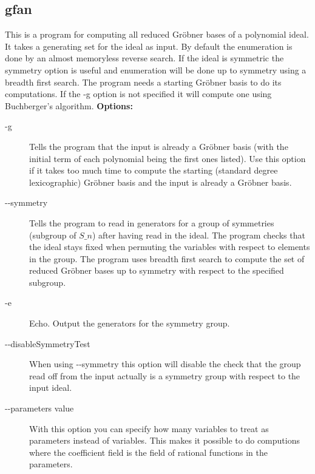 {\subsection{gfan}\label{applist:}
This is a program for computing all reduced Gr\"obner bases of a polynomial ideal. It takes a generating set for the ideal as input. By default the enumeration is done by an almost memoryless reverse search. If the ideal is symmetric the symmetry option is useful and enumeration will be done up to symmetry using a breadth first search. The program needs a starting Gr\"obner basis to do its computations. If the -g option is not specified it will compute one using Buchberger's algorithm.
\newline
{\bf Options:}
\begin{description}
\item[-g]Tells the program that the input is already a Gr\"obner basis (with the initial term of each polynomial being the first ones listed). Use this option if it takes too much time to compute the starting (standard degree lexicographic) Gr\"obner basis and the input is already a Gr\"obner basis.
\item[-\hspace{0.013cm}-symmetry]Tells the program to read in generators for a group of symmetries (subgroup of $S\_n$) after having read in the ideal. The program checks that the ideal stays fixed when permuting the variables with respect to elements in the group. The program uses breadth first search to compute the set of reduced Gr\"obner bases up to symmetry with respect to the specified subgroup.
\item[-e]Echo. Output the generators for the symmetry group.
\item[-\hspace{0.013cm}-disableSymmetryTest]When using -\hspace{0.013cm}-symmetry this option will disable the check that the group read off from the input actually is a symmetry group with respect to the input ideal.
\item[-\hspace{0.013cm}-parameters value]With this option you can specify how many variables to treat as parameters instead of variables. This makes it possible to do computions where the coefficient field is the field of rational functions in the parameters.\end{description}


}
